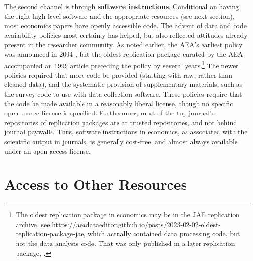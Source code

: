 \documentclass{article}
\begin{document}
The second channel is through  \textbf{software instructions}. Conditional on having the right high-level software and the appropriate resources (see next section), most economics papers have openly accessible code. The advent of data and code availability policies most certainly has helped, but also reflected attitudes already present in the researcher community. As noted earlier, the AEA's earliest policy was announced in 2004 \citep{bernanke_editorial_2004}, but the oldest replication package curated by the AEA accompanied an 1999 article \citep{frankel_does_1999,frankel_replication_1999} preceding the policy by several years.\footnote{The oldest  replication package in economics may be \citet{koenker_asymptotic_1988-1} in the JAE replication archive, see \url{https://aeadataeditor.github.io/posts/2023-02-02-oldest-replication-package-jae}, which actually contained data processing code, but not the data analysis code. That was only published in a later replication package, \citet{koenker_reproducible_2009}.} The newer policies \citep{AEA-announcement-July-2019,koren_data_2022} required that more code be provided (starting with raw, rather than cleaned data), and the systematic provision of supplementary materials, such as the survey code to use with data collection software. These policies require that the code be made available in a reasonably liberal license, though no specific open source license is specified. Furthermore, most of the top journal's repositories of replication packages are at trusted repositories, and not behind journal paywalls. Thus, software instructions in economics, as associated with the scientific output in journals, is generally cost-free, and almost always available under an open access license. 



%


\section{Access to Other Resources}
\label{sec:other_resources}
\end{document}
